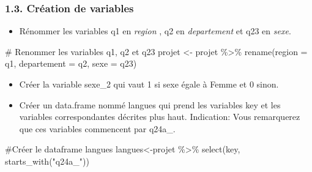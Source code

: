 \documentclass[
  letterpaper,
  DIV=11,
  numbers=noendperiod]{scrartcl}
\newenvironment{Shaded}{\begin{snugshade}}{\end{snugshade}}
\newcommand{\AttributeTok}[1]{\textcolor[rgb]{0.40,0.45,0.13}{#1}}
\newcommand{\CommentTok}[1]{\textcolor[rgb]{0.37,0.37,0.37}{#1}}
\newcommand{\DecValTok}[1]{\textcolor[rgb]{0.68,0.00,0.00}{#1}}
\newcommand{\FunctionTok}[1]{\textcolor[rgb]{0.28,0.35,0.67}{#1}}
\newcommand{\NormalTok}[1]{\textcolor[rgb]{0.00,0.23,0.31}{#1}}
\newcommand{\OtherTok}[1]{\textcolor[rgb]{0.00,0.23,0.31}{#1}}
\newcommand{\SpecialCharTok}[1]{\textcolor[rgb]{0.37,0.37,0.37}{#1}}
\newcommand{\StringTok}[1]{\textcolor[rgb]{0.13,0.47,0.30}{#1}}
\providecommand{\tightlist}{%
  \setlength{\itemsep}{0pt}\setlength{\parskip}{0pt}}\usepackage{longtable,booktabs,array}
\begin{document}
\hypertarget{cruxe9ation-de-variables}{%
\subsubsection{1.3. Création de
variables}\label{cruxe9ation-de-variables}}

\begin{itemize}
\tightlist
\item
  Rénommer les variables q1 en \emph{region} , q2 en \emph{departement}
  et q23 en \emph{sexe}.
\end{itemize}

\begin{Shaded}
\begin{Highlighting}[]
\CommentTok{\# Renommer les variables q1, q2 et q23}
\NormalTok{projet }\OtherTok{\textless{}{-}}\NormalTok{ projet }\SpecialCharTok{\%\textgreater{}\%}
              \FunctionTok{rename}\NormalTok{(}\AttributeTok{region =}\NormalTok{ q1, }\AttributeTok{departement =}\NormalTok{ q2, }\AttributeTok{sexe =}\NormalTok{ q23)}
\end{Highlighting}
\end{Shaded}

\begin{itemize}
\tightlist
\item
  Créer la variable sexe\_2 qui vaut 1 si sexe égale à Femme et 0 sinon.
\end{itemize}

\begin{Shaded}
\end{Shaded}

\begin{itemize}
\tightlist
\item
  Créer un data.frame nommé langues qui prend les variables key et les
  variables correspondantes décrites plus haut. Indication: Vous
  remarquerez que ces variables commencent par q24a\_.
\end{itemize}

\begin{Shaded}
\begin{Highlighting}[]
\CommentTok{\#Créer le dataframe langues}
\NormalTok{langues}\OtherTok{\textless{}{-}}\NormalTok{projet }\SpecialCharTok{\%\textgreater{}\%} 
            \FunctionTok{select}\NormalTok{(key, }\FunctionTok{starts\_with}\NormalTok{(}\StringTok{"q24a\_"}\NormalTok{))}
\end{Highlighting}
\end{Shaded}
\end{document}
